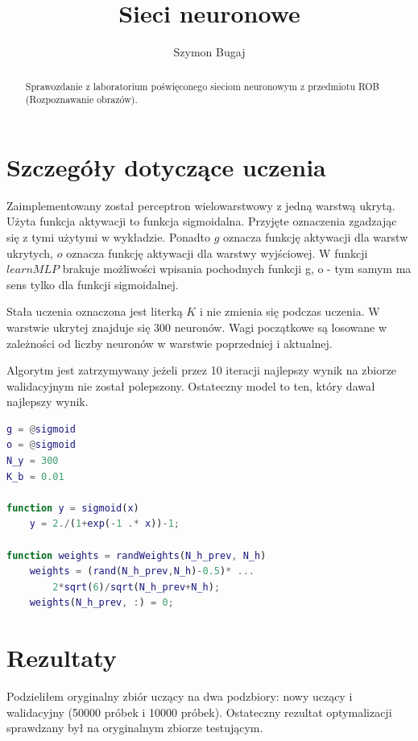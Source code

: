 \documentclass[fleqn]{article}
\begin{document}
\title{Sieci neuronowe}
\author{Szymon Bugaj}

\maketitle

\begin{abstract}
Sprawozdanie z laboratorium poświęconego sieciom neuronowym z przedmiotu ROB (Rozpoznawanie obrazów).
\end{abstract}

\section{Szczegóły dotyczące uczenia}
Zaimplementowany został perceptron wielowarstwowy z jedną warstwą ukrytą.
Użyta funkcja aktywacji to funkcja sigmoidalna. Przyjęte oznaczenia zgadzając się z tymi użytymi w wykładzie. Ponadto $g$ oznacza funkcję aktywacji dla warstw ukrytych, $o$ oznacza funkcję aktywacji dla warstwy wyjściowej. W funkcji $learnMLP$ brakuje możliwości wpisania pochodnych funkcji g, o - tym samym ma sens tylko dla funkcji sigmoidalnej.

Stała uczenia oznaczona jest literką $K$ i nie zmienia się podczas uczenia.
W warstwie ukrytej znajduje się 300 neuronów. Wagi początkowe są losowane w zależności od liczby neuronów w warstwie poprzedniej i aktualnej.

Algorytm jest zatrzymywany jeżeli przez 10 iteracji najlepszy wynik na zbiorze walidacyjnym nie został polepszony. Ostateczny model to ten, który dawał najlepszy wynik.

\begin{minipage}{\linewidth}
\begin {lstlisting}[language=Matlab]
g = @sigmoid
o = @sigmoid
N_y = 300
K_b = 0.01

function y = sigmoid(x)
	y = 2./(1+exp(-1 .* x))-1;
    
function weights = randWeights(N_h_prev, N_h)
	weights = (rand(N_h_prev,N_h)-0.5)* ...
        2*sqrt(6)/sqrt(N_h_prev+N_h);
	weights(N_h_prev, :) = 0;
\end{lstlisting}
\end{minipage}


\section{Rezultaty}
Podzieliłem oryginalny zbiór uczący na dwa podzbiory: nowy uczący i walidacyjny (50000 próbek i 10000 próbek). Ostateczny rezultat optymalizacji sprawdzany był na oryginalnym zbiorze testującym.
\end{document}
